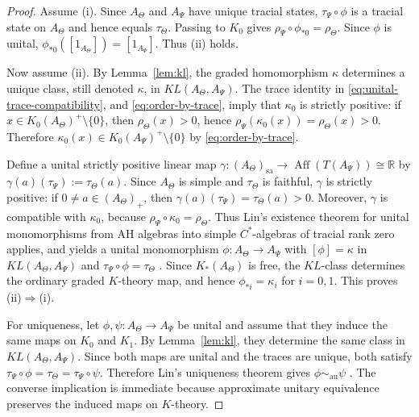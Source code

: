 \documentclass[11pt]{amsart}
\theoremstyle{definition}
\theoremstyle{remark}
\newcommand{\R}{\mathbb{R}}
\begin{document}
\begin{proof}

Assume \textup{(i)}. Since $A_{\Theta}$ and $A_{\Psi}$ have unique tracial states, $\tau_{\Psi}\circ\phi$ is a tracial state on $A_{\Theta}$ and hence equals $\tau_{\Theta}$. Passing to $K_0$ gives $\rho_{\Psi}\circ\phi_{\ast 0}=\rho_{\Theta}.$
Since $\phi$ is unital, $\phi_{\ast 0}([1_{A_{\Theta}}])=[1_{A_{\Psi}}]$. Thus \textup{(ii)} holds.

Now assume \textup{(ii)}. By Lemma~\ref{lem:kl}, the graded homomorphism $\kappa$ determines a unique class, still denoted $\kappa$, in $KL(A_{\Theta},A_{\Psi})$. The trace identity in \eqref{eq:unital-trace-compatibility}, and \eqref{eq:order-by-trace}, imply that $\kappa_0$ is strictly positive: if $x\in K_0(A_{\Theta})^+\setminus\{0\}$, then $\rho_{\Theta}(x)>0$, hence $\rho_{\Psi}(\kappa_0(x))=\rho_{\Theta}(x)>0$. Therefore $\kappa_0(x)\in K_0(A_{\Psi})^+\setminus\{0\}$ by \eqref{eq:order-by-trace}.

Define a unital strictly positive linear map $\gamma\colon (A_{\Theta})_{\mathrm{sa}}\to \operatorname{Aff}(T(A_{\Psi}))\cong \R$
by $\gamma(a)(\tau_{\Psi}) := \tau_{\Theta}(a).$ Since $A_{\Theta}$ is simple and $\tau_{\Theta}$ is faithful, $\gamma$ is strictly positive: if $0\neq a\in (A_\Theta)_+$, then $\gamma(a)(\tau_\Psi)=\tau_\Theta(a)>0.$ Moreover, $\gamma$ is compatible with $\kappa_0$, because $\rho_\Psi\circ\kappa_0=\rho_\Theta.$ Thus Lin's existence theorem for unital monomorphisms from AH algebras into simple $C^\ast$-algebras of tracial rank zero applies, and yields a unital monomorphism $\phi\colon A_{\Theta}\to A_{\Psi}$
with $[\phi]=\kappa$ in $KL(A_{\Theta},A_{\Psi})$ and $\tau_{\Psi}\circ\phi=\tau_{\Theta}$ \cite[Theorem~5.2]{LinRange}. 
Since $K_*(A_\Theta)$ is free, the $KL$-class determines the ordinary
graded $K$-theory map, and hence $\phi_{\ast i}=\kappa_i$ for $i=0,1$. This proves \textup{(ii)}$\Rightarrow$\textup{(i)}.

For uniqueness, let $\phi,\psi\colon A_{\Theta}\to A_{\Psi}$ be unital and assume that they induce the same maps on $K_0$ and $K_1$. By Lemma~\ref{lem:kl}, they determine the same class in $KL(A_{\Theta},A_{\Psi})$. Since both maps are unital and the traces are unique, both satisfy $\tau_{\Psi}\circ\phi=\tau_{\Theta}=\tau_{\Psi}\circ\psi.$
Therefore Lin's uniqueness theorem gives $\phi\sim_{\mathrm{au}}\psi$ \cite[Theorem~3.1]{LinRange}. The converse implication is immediate because approximate unitary equivalence preserves the induced maps on $K$-theory.\end{proof}
\end{document}
